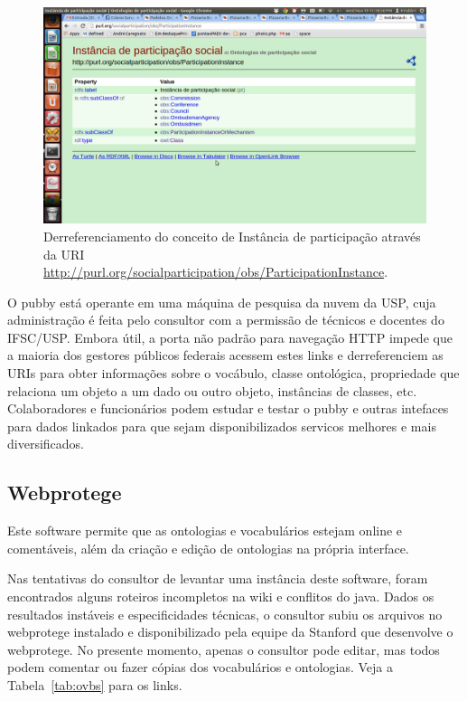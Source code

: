 \documentclass[12pt]{article}
\begin{document}
\begin{figure}[h!]
  \centering
    \includegraphics[width=\textwidth]{../figs/derre.png}
  \caption{Derreferenciamento do conceito de Instância de participação através da URI \url{http://purl.org/socialparticipation/obs/ParticipationInstance}.}\label{fig:derre}
\end{figure}

O pubby está operante em uma máquina de pesquisa da nuvem da USP, cuja administração é feita pelo consultor com a permissão de técnicos e docentes do IFSC/USP. Embora útil, a porta não padrão para navegação HTTP impede que a maioria dos gestores públicos federais acessem estes links e derreferenciem as URIs para obter informações sobre o vocábulo, classe ontológica, propriedade que relaciona um objeto a um dado ou outro objeto, instâncias de classes, etc. Colaboradores e funcionários podem estudar e testar o pubby e outras intefaces para dados linkados para que sejam disponibilizados servicos melhores e mais diversificados.

\subsection{Webprotege}

Este software permite que as ontologias e vocabulários estejam online e comentáveis, além da criação e edição de ontologias na própria interface.

Nas tentativas do consultor de levantar uma instância deste software, foram encontrados alguns roteiros incompletos na wiki e conflitos do java. Dados os resultados instáveis e especificidades técnicas, o consultor subiu os arquivos no webprotege instalado e disponibilizado pela equipe da Stanford que desenvolve o webprotege. 
No presente momento, apenas o consultor pode editar, mas todos podem comentar ou fazer cópias dos vocabulários e ontologias. Veja a Tabela~\ref{tab:ovbs} para os links.
\end{document}
